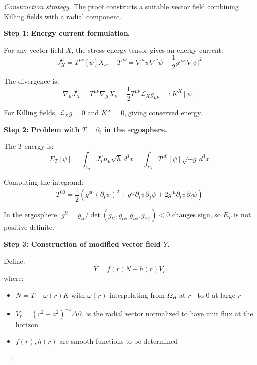 \documentclass[12pt,a4paper]{article}
\begin{document}
\begin{proof}[Construction strategy]
The proof constructs a suitable vector field combining Killing fields with a radial component.

\textbf{Step 1: Energy current formulation.}

For any vector field $X$, the stress-energy tensor gives an energy current:
\begin{equation}
J_X^\mu = T^{\mu\nu}[\psi]X_\nu, \quad T^{\mu\nu} = \nabla^\mu\psi\nabla^\nu\psi - \frac{1}{2}g^{\mu\nu}|\nabla\psi|^2
\end{equation}

The divergence is:
\begin{equation}
\nabla_\mu J_X^\mu = T^{\mu\nu}\nabla_\mu X_\nu = \frac{1}{2}T^{\mu\nu}\mathcal{L}_X g_{\mu\nu} =: K^X[\psi]
\end{equation}

For Killing fields, $\mathcal{L}_X g = 0$ and $K^X = 0$, giving conserved energy.

\textbf{Step 2: Problem with $T = \partial_t$ in the ergosphere.}

The $T$-energy is:
\begin{equation}
E_T[\psi] = \int_{\Sigma_t} J_T^\mu n_\mu \sqrt{h}\, d^3x = \int_{\Sigma_t} T^{\mu 0}[\psi]\sqrt{-g}\, d^3x
\end{equation}

Computing the integrand:
\begin{equation}
T^{00} = \frac{1}{2}\left(g^{00}(\partial_t\psi)^2 + g^{ij}\partial_i\psi\partial_j\psi + 2g^{0i}\partial_t\psi\partial_i\psi\right)
\end{equation}

In the ergosphere, $g^{tt} = g_{tt}/\det(g_{tt}, g_{t\phi}; g_{t\phi}, g_{\phi\phi}) < 0$ changes sign, so $E_T$ is not positive definite.

\textbf{Step 3: Construction of modified vector field $Y$.}

Define:
\begin{equation}
Y = f(r)N + h(r)V_r
\end{equation}
where:
\begin{itemize}
    \item $N = T + \omega(r)K$ with $\omega(r)$ interpolating from $\Omega_H$ at $r_+$ to 0 at large $r$
    \item $V_r = (r^2 + a^2)^{-1}\Delta\partial_r$ is the radial vector normalized to have unit flux at the horizon
    \item $f(r), h(r)$ are smooth functions to be determined
\end{itemize}


\end{proof}
\end{document}
